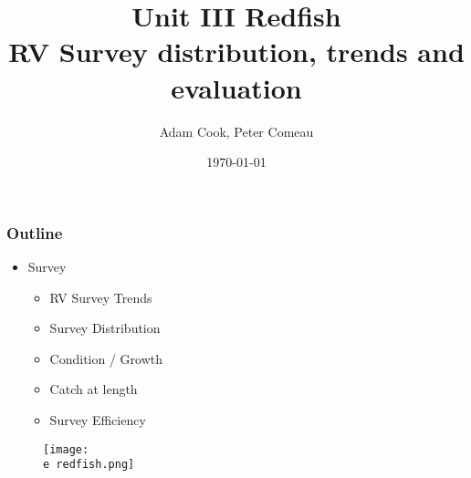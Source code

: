 \documentclass{beamer}
\title[Unit III Redfish]{Unit III Redfish\\ RV Survey distribution, trends and evaluation }
\author{Adam Cook, Peter Comeau} %
\institute[Population Ecology Division] 
{
Bedford Institute of Oceanography \\ %
\medskip
\textit{Adam.Cook@dfo-mpo.gc.ca} %
}
\date{\today} %
\begin{document}
\begin{frame}
\titlepage %
\end{frame}
\newcommand{\D}{.}
\newcommand{\e}{/home/ecomod_data/redfish/figures/}



\begin{frame}
\frametitle{Outline}
\begin{block}

\begin{itemize}


\item Survey
	\begin{itemize}
		\item RV Survey Trends
		\item Survey Distribution
		\item Condition / Growth
		\item Catch at length
		\item Survey Efficiency
	\end{itemize}

				\end{itemize}
				\end{block}
				\begin{figure}
				\vspace*{-.75cm}
				 \hspace*{5cm} \centerline{\texttt{[image: \\e redfish.png]}} 
				 \vspace*{-1.5cm}
				 \end{figure}

\end{frame}


\end{document}
